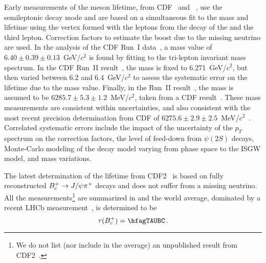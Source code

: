 
Early measurements of the \Bc meson lifetime,
from CDF~\cite{Abe:1998wi,CDFnote9294:2008,Abulencia:2006zu} and \dzero~\cite{Abazov:2008rba},
use the semileptonic decay mode \particle{\Bc \to \jpsi \ell} and are based on a 
simultaneous fit to the mass and lifetime using the vertex formed
with the leptons from the decay of the \particle{\jpsi} and
the third lepton. Correction factors
to estimate the boost due to the missing neutrino are used.
In the analysis of the CDF Run~I data~\cite{Abe:1998wi},
a mass value of 
$6.40 \pm 0.39 \pm 0.13$~GeV/$c^2$ 
is found by fitting
to the tri-lepton invariant mass spectrum. 
In the CDF Run~II result~\cite{Abulencia:2006zu}, the mass is fixed
to 6.271~GeV/$c^2$, but then varied between 
6.2 and 6.4~GeV/$c^2$ to assess the systematic error on the
lifetime due to the \Bc mass value.
Finally, in the \dzero Run~II result~\cite{Abazov:2008rba}, 
the \Bc mass is assumed to be 
$6285.7 \pm 5.3 \pm 1.2$~MeV/$c^2$, taken from a 
CDF result~\cite{Abulencia:2005usa}. 
These mass measurements
are consistent within uncertainties, and also consistent with the
most recent precision determination from CDF of 
$6275.6 \pm 2.9 \pm 2.5$~MeV/$c^2$~\cite{Aaltonen:2007gv}.
Correlated systematic errors include the impact
of the uncertainty of the \Bc $p_T$ spectrum on the correction
factors, the level of feed-down from $\psi(2S)$ decays, 
Monte-Carlo modeling of the decay model varying from phase space
to the ISGW model, and mass variations.

The latest determination of the \Bc lifetime from CDF2~\cite{Aaltonen:2012yb} is based on fully reconstructed 
$B^+_c \to J/\psi \pi^+$ decays and does not suffer from a missing neutrino. 
All the measurements\footnote{We do not list (nor include in the average) an unpublished result from CDF2~\cite{CDFnote9294:2008}.}
are summarized in 
 and the world average, dominated by a recent LHCb measurement~\cite{Aaij:2014bva}, is 
determined to be
\begin{equation}
\tau(\Bc) = \hfagTAUBC \,.
\end{equation}

